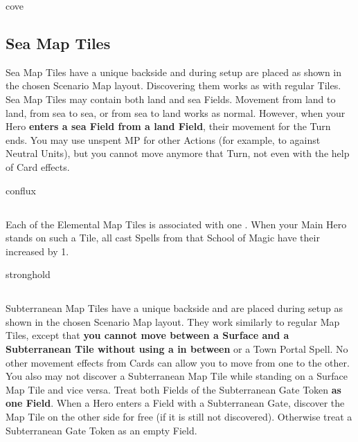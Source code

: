 \begin{multicols*}{2}
\begin{expansion}{cove}
  \subsection*{Sea Map Tiles}
  Sea Map Tiles have a unique backside and during setup are placed as shown in the chosen Scenario Map layout.
  Discovering them works as with regular Tiles.
  Sea Map Tiles may contain both land and sea Fields.
  Movement from land to land, from sea to sea, or from sea to land works as normal.
  However, when your Hero \textbf{enters a sea Field from a land Field}, their movement for the Turn ends.
  You may use unspent MP for other Actions (for example, to  against Neutral Units), but you cannot move anymore that Turn, not even with the help of Card effects.
\end{expansion}

\bigskip

\begin{expansion}{conflux}
  \subsection*{}
  Each of the Elemental Map Tiles is associated with one .
  When your Main Hero stands on such a Tile, all cast Spells from that School of Magic have their  increased by 1.
\end{expansion}

\bigskip

\begin{expansion}{stronghold}
  \subsection*{}
  Subterranean Map Tiles have a unique backside and are placed during setup as shown in the chosen Scenario Map layout.
  They work similarly to regular Map Tiles, except that \textbf{you cannot move between a Surface and a Subterranean Tile without using a  in between} or a Town Portal Spell.
  No other movement effects from Cards can allow you to move from one to the other.
  You also may not discover a Subterranean Map Tile while standing on a Surface Map Tile and vice versa.
  Treat both Fields of the Subterranean Gate Token \textbf{as one Field}.
  When a Hero enters a Field with a Subterranean Gate, discover the Map Tile on the other side for free (if it is still not discovered).
  Otherwise treat a Subterranean Gate Token as an empty Field.
\end{expansion}


\end{multicols*}
